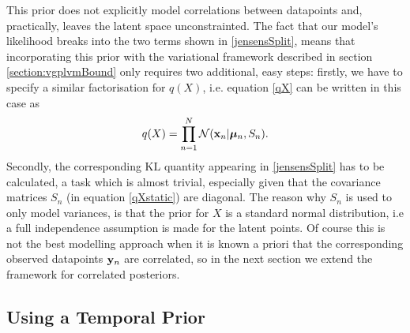 \documentclass [10pt , a4paper]{article}
\begin{document}
\noindent This prior does not explicitly model correlations between datapoints and, practically, leaves the latent space unconstrainted.
The fact that our model's likelihood breaks into the two terms shown in \eqref{jensensSplit}, means that incorporating this
prior with the variational framework described in section \ref{section:vgplvmBound} only requires two additional, easy steps:
firstly, we have to specify a similar factorisation for $q(X)$, i.e. equation \eqref{qX} can be written in this case as
\begin{equation}
  \label{qXstatic}
  q(X) = \prod_{n=1}^N \mathcal{N}(\mathbf{x}_n | \boldsymbol \mu_n, S_n).
\end{equation} 
Secondly, the corresponding $\text{KL}$ quantity appearing in \eqref{jensensSplit}  has to be calculated, a task which is
almost trivial, especially given that the covariance matrices $S_n$ (in equation \eqref{qXstatic}) are diagonal.
The reason why $S_n$ is used to only model variances, is
that the prior for $X$ is a standard normal distribution, i.e a full independence assumption is made for the latent points.
Of course this is not the best modelling approach when it is known a priori that the corresponding observed datapoints $\mathbf{y}_n$
are correlated,
so in the next section we extend the framework for correlated posteriors.






\subsection{\label{temporalPrior} Using a Temporal Prior}
\end{document}
